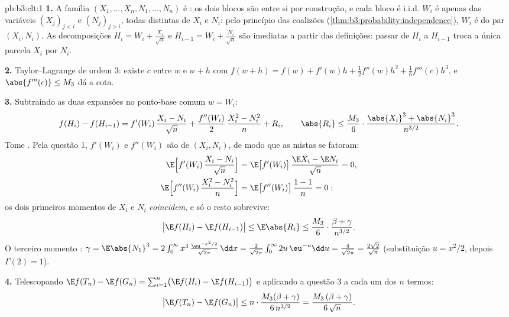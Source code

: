 \begin{solution}{pb:b3:clt:1}
\textbf{1.} A família $(X_1, \dots, X_n, N_1, \dots, N_n)$
é : os dois blocos são  entre
si por construção, e cada bloco é i.i.d. $W_i$ é  apenas das variáveis $(X_j)_{j<i}$ e
$(N_j)_{j>i}$, todas distintas de $X_i$ e $N_i$: pelo
princípio das coalizões
(\cref{thm:b3:probability:independence}), $W_i$ é
 do par $(X_i, N_i)$. As decomposições
$H_i = W_i + \frac{X_i}{\sqrt n}$ e $H_{i-1} = W_i +
\frac{N_i}{\sqrt n}$ são imediatas a partir das definições:
passar de $H_i$ a $H_{i-1}$ troca a única parcela
$X_i$ por $N_i$.

\textbf{2.} Taylor--Lagrange de ordem $3$: existe $c$
entre $w$ e $w + h$ com $f(w + h) = f(w) + f'(w)h +
\frac12f''(w)h^2 + \frac16f'''(c)h^3$, e $\abs{f'''(c)}
\leq M_3$ dá a cota.

\textbf{3.} Subtraindo as duas expansões no ponto-base
comum $w = W_i$:
\[
f(H_i) - f(H_{i-1}) = f'(W_i)\,\frac{X_i - N_i}{\sqrt n} +
\frac{f''(W_i)}{2}\,\frac{X_i^2 - N_i^2}{n} + R_i,
\qquad
\abs{R_i} \leq \frac{M_3}{6}\cdot
\frac{\abs{X_i}^3 + \abs{N_i}^3}{n^{3/2}} .
\]
Tome . Pela questão 1, $f'(W_i)$ e $f''(W_i)$
são  de $(X_i, N_i)$, de modo que as  mistas
se fatoram:
\begin{align*}
\E\Bigl[f'(W_i)\,\frac{X_i - N_i}{\sqrt n}\Bigr] &=
\E\bigl[f'(W_i)\bigr]\,\frac{\E X_i - \E N_i}{\sqrt n} = 0,
\\
\E\Bigl[f''(W_i)\,\frac{X_i^2 - N_i^2}{n}\Bigr] &=
\E\bigl[f''(W_i)\bigr]\,\frac{1 - 1}{n} = 0 :
\end{align*}
os dois primeiros momentos de $X_i$ e $N_i$ \emph{coincidem}, e
só o resto sobrevive:
\[
\bigl|\E f(H_i) - \E f(H_{i-1})\bigr| \leq \E\abs{R_i} \leq
\frac{M_3}{6}\cdot\frac{\beta + \gamma}{n^{3/2}} .
\]
O terceiro momento : $\gamma = \E\abs{N_1}^3 =
2\int_0^\infty x^3\,\frac{\eu^{-x^2/2}}{\sqrt{2\pi}}\,\dd x
= \frac{2}{\sqrt{2\pi}}\int_0^\infty 2u\,\eu^{-u}\dd u =
\frac{4}{\sqrt{2\pi}} = \frac{2\sqrt2}{\sqrt\pi}$
(substituição $u = x^2/2$, depois $\Gamma(2) = 1$).

\textbf{4.} Telescopando $\E f(T_n) - \E f(G_n) =
\sum_{i=1}^n\bigl(\E f(H_i) - \E f(H_{i-1})\bigr)$ e
aplicando a questão 3 a cada um dos $n$ termos:
\[
\bigl|\E f(T_n) - \E f(G_n)\bigr| \leq
n \cdot \frac{M_3(\beta + \gamma)}{6\,n^{3/2}} =
\frac{M_3\,(\beta + \gamma)}{6\,\sqrt n} .
\]


\end{solution}
